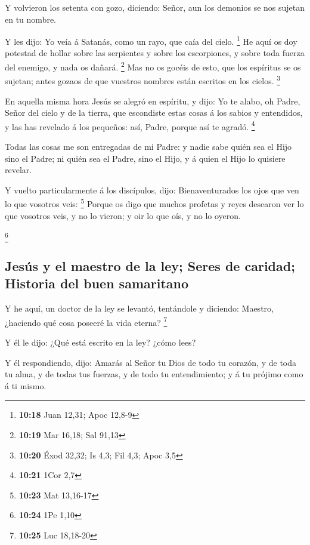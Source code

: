  Y volvieron los setenta con gozo, diciendo: Señor, aun los
demonios se nos sujetan en tu nombre.

 Y les dijo: Yo veía á Satanás, como un rayo, que caía del
cielo. \footnote{\textbf{10:18} Juan 12,31; Apoc 12,8-9} 
He aquí os doy potestad de hollar sobre las serpientes y sobre los
escorpiones, y sobre toda fuerza del enemigo, y nada os dañará.
\footnote{\textbf{10:19} Mar 16,18; Sal 91,13}  Mas no os
gocéis de esto, que los espíritus se os sujetan; antes gozaos de que
vuestros nombres están escritos en los cielos. \footnote{\textbf{10:20}
  Éxod 32,32; Is 4,3; Fil 4,3; Apoc 3,5}

 En aquella misma hora Jesús se alegró en espíritu, y dijo:
Yo te alabo, oh Padre, Señor del cielo y de la tierra, que escondiste
estas cosas á los sabios y entendidos, y las has revelado á los
pequeños: así, Padre, porque así te agradó. \footnote{\textbf{10:21}
  1Cor 2,7}

 Todas las cosas me son entregadas de mi Padre: y nadie
sabe quién sea el Hijo sino el Padre; ni quién sea el Padre, sino el
Hijo, y á quien el Hijo lo quisiere revelar.

 Y vuelto particularmente á los discípulos, dijo:
Bienaventurados los ojos que ven lo que vosotros veis: \footnote{\textbf{10:23}
  Mat 13,16-17}  Porque os digo que muchos profetas y reyes
desearon ver lo que vosotros veis, y no lo vieron; y oir lo que oís, y
no lo oyeron.

\footnote{\textbf{10:24} 1Pe 1,10}

\hypertarget{jesuxfas-y-el-maestro-de-la-ley-seres-de-caridad-historia-del-buen-samaritano}{%
\subsection{Jesús y el maestro de la ley; Seres de caridad; Historia del
buen
samaritano}\label{jesuxfas-y-el-maestro-de-la-ley-seres-de-caridad-historia-del-buen-samaritano}}

 Y he aquí, un doctor de la ley se levantó, tentándole y
diciendo: Maestro, ¿haciendo qué cosa poseeré la vida eterna?
\footnote{\textbf{10:25} Luc 18,18-20}

 Y él le dijo: ¿Qué está escrito en la ley? ¿cómo lees?

 Y él respondiendo, dijo: Amarás al Señor tu Dios de todo
tu corazón, y de toda tu alma, y de todas tus fuerzas, y de todo tu
entendimiento; y á tu prójimo como á ti mismo.

